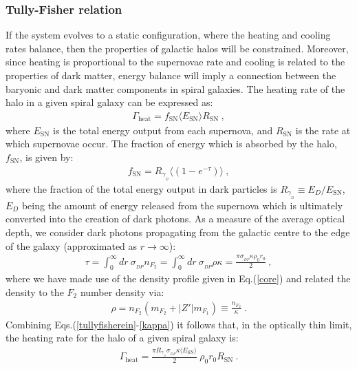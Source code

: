 \documentclass[12pt]{article}
\begin{document}
{{\subsubsection{Tully-Fisher relation}

If the system evolves to a static configuration, where the heating and cooling rates  balance, then the properties of galactic halos will be constrained. Moreover, since heating is proportional to the supernovae rate and cooling is related to the properties of dark matter, energy balance will imply a connection between the baryonic and dark matter components in spiral galaxies. The heating rate of the halo in a given spiral galaxy can be expressed as:
%
\begin{eqnarray}
\Gamma _{\text{heat}} = f _{\text{SN}}\langle E _{\text{SN}} \rangle R _{\text{SN}} \ ,
\label{tullyfisherein}
\end{eqnarray}
%
where $E _{\text{SN}}$ is the total energy output from each supernova, and $R _{\text{SN}}$ is the rate at which supernovae occur. The fraction of energy which is absorbed by the halo, $f _{\text{SN}}$, is given by:
%
\begin{eqnarray}
f _{\text{SN}} = R _{\gamma _{_D}}\langle \left (1 - e ^{-\tau} \right )\rangle \ ,
\label{fsn}
\end{eqnarray}
%
where the fraction of the total energy output in dark particles is $R _{\gamma _{_D}} \equiv E _D/E _{\text{SN}}$, $E _D$ being the amount of energy released from the supernova which is ultimately converted into the creation of dark photons. As a measure of the average optical depth, we consider dark photons propagating from the galactic centre to the edge of the galaxy (approximated as $r \rightarrow \infty$):
%
\begin{eqnarray}
\tau = \int _0 ^{\infty} dr \ \sigma _{_{DP}}n _{F_2} = \int _0 ^{\infty} dr \ \sigma _{_{DP}} \rho \kappa = \frac{\pi \sigma _{_{DP}} \kappa \rho _0r _0}{2} \ ,
\label{opticaldepth}
\end{eqnarray}
%
where we have made use of the density profile given in Eq.(\ref{core}) and related the density to the $F _2$ number density via:
%
\begin{eqnarray}
\rho = n _{F_2}(m _{F_2} + |Z'|m _{F_1}) \equiv \frac{n _{F_2}}{\kappa} \ .
\label{kappa}
\end{eqnarray}
%
Combining Eqs.(\ref{tullyfisherein}-\ref{kappa}) it follows that, in the optically thin limit, the heating rate for the halo of a given spiral galaxy is:
%
\begin{eqnarray}
\Gamma _{\text{heat}} = \frac{\pi R _{\gamma _{_D}}\sigma _{_{DP}}\kappa \langle E _{\text{SN}} \rangle}{2} \ \rho _0r _0R _{\text{SN}} \ .
\label{tullyfisherein1}
\end{eqnarray}
%

}}
\end{document}
